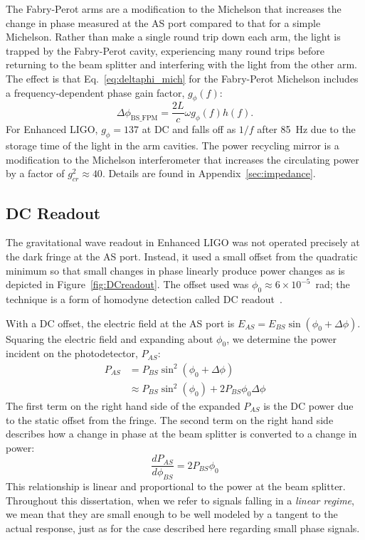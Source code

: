 The Fabry-Perot arms are a modification to the Michelson that
increases the change in phase measured at the AS port compared to that
for a simple Michelson. Rather than make a single round trip down each
arm, the light is trapped by the Fabry-Perot cavity, experiencing many
round trips before returning to the beam splitter and interfering with
the light from the other arm. The effect is that Eq.~\ref{eq:deltaphi_mich}
for the Fabry-Perot Michelson includes a frequency-dependent phase
gain factor, $g_{\phi}(f)$:
\begin{equation}
\Delta \phi_{\mathrm{BS\_FPM}} = \frac{2 L}{c} \omega g_{\phi}(f) h(f).
\label{eq:deltaphi}
\end{equation}
For Enhanced LIGO, $g_{\phi} = 137$ at DC and falls off as $1/f$ after
85~Hz due to the storage time of the light in the arm cavities. The
power recycling mirror is a modification to the Michelson
interferometer that increases the circulating power by a factor of
$g_{cr}^2 \approx 40$. Details are found in
Appendix~\ref{sec:impedance}.


\subsection{DC Readout}
\label{sec:DCreadout}
The gravitational wave readout in Enhanced LIGO was not operated
precisely at the dark fringe at the AS port. Instead, it used a small
offset from the quadratic minimum so that small changes in phase
linearly produce power changes as is depicted in
Figure~\ref{fig:DCreadout}. The offset used was $\phi_0 \approx 6
\times 10^{-5}$~rad; the technique is a form of homodyne detection
called DC readout~\cite{TobinThesis}.

With a DC offset, the electric field at the AS port is $E_{AS} =
E_{BS}\sin{(\phi_0 + \Delta\phi)}$. Squaring the electric field and
expanding about $\phi_0$, we determine the power incident on the
photodetector, $P_{AS}$:
\begin{align}
P_{AS} &= P_{BS} \sin^2{(\phi_0 + \Delta\phi)} \\
 &\approx P_{BS}\sin^2{(\phi_0)} + 2P_{BS}\phi_0\Delta\phi
\end{align}
The first term on the right hand side of the expanded $P_{AS}$ is the
DC power due to the static offset from the fringe. The second term on
the right hand side describes how a change in phase at the beam
splitter is converted to a change in power:
\begin{equation}
\frac{d P_{AS}}{d \phi_{BS}} =2 P_{BS} \phi_0 
\label{eq:dP_dphi}
\end{equation}
This relationship is linear and proportional to the power at the beam
splitter. Throughout this dissertation, when we refer to signals
falling in a \emph{linear regime}, we mean that they are small enough
to be well modeled by a tangent to the actual response, just as for
the case described here regarding small phase signals.

